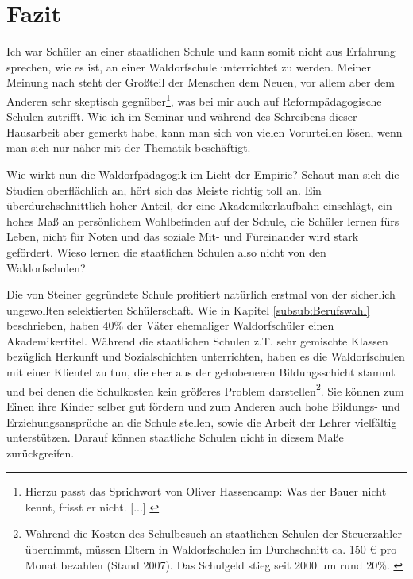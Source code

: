 \section{Fazit}

Ich war Schüler an einer staatlichen Schule und kann somit nicht aus Erfahrung sprechen, wie es ist, an einer Waldorfschule unterrichtet zu werden. Meiner Meinung nach steht der Großteil der Menschen dem Neuen, vor allem aber dem Anderen sehr skeptisch gegnüber\footnote{Hierzu passt das Sprichwort von Oliver Hassencamp: Was der Bauer nicht kennt, frisst er nicht. [...] \citep[Vgl.][]{roschk13}}, was bei mir auch auf Reformpädagogische Schulen zutrifft. Wie ich im Seminar und während des Schreibens dieser Hausarbeit aber  gemerkt habe, kann man sich von vielen Vorurteilen lösen, wenn man sich nur näher mit der Thematik beschäftigt.

Wie wirkt nun die Waldorfpädagogik im Licht der Empirie? Schaut man sich die Studien oberflächlich an, hört sich das Meiste richtig toll an. Ein überdurchschnittlich hoher Anteil, der eine Akademikerlaufbahn einschlägt, ein hohes Maß an persönlichem Wohlbefinden auf der Schule, die Schüler lernen fürs Leben, nicht für Noten und das soziale Mit- und Füreinander wird stark gefördert. Wieso lernen die staatlichen Schulen also nicht von den Waldorfschulen? 

Die von Steiner gegründete Schule profitiert natürlich erstmal von der sicherlich ungewollten selektierten Schülerschaft. Wie in Kapitel \ref{subsub:Berufswahl} beschrieben, haben 40\% der Väter ehemaliger Waldorfschüler einen Akademikertitel. Während die staatlichen Schulen z.T. sehr gemischte Klassen bezüglich Herkunft und Sozialschichten unterrichten, haben es die Waldorfschulen mit einer Klientel zu tun, die eher aus der gehobeneren Bildungsschicht stammt und bei denen die Schulkosten kein größeres Problem darstellen\footnote{Während die Kosten des Schulbesuch an staatlichen Schulen der Steuerzahler übernimmt, müssen Eltern in Waldorfschulen im Durchschnitt ca. 150 € pro Monat bezahlen (Stand 2007). Das Schulgeld stieg seit 2000 um rund 20\%. \citep[Vgl.][]{mannheim09}}. Sie können zum Einen ihre Kinder selber gut fördern und zum Anderen auch hohe Bildungs- und Erziehungsansprüche an die Schule stellen, sowie die Arbeit der Lehrer vielfältig unterstützen. Darauf können staatliche Schulen nicht in diesem Maße zurückgreifen. 

